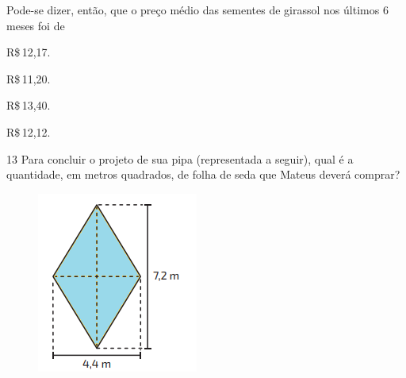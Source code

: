 Pode-se dizer, então, que o preço médio das sementes de girassol nos
últimos 6 meses foi de

\begin{escolha}
\item R\$\,12,17.
\item R\$\,11,20.
\item R\$\,13,40.
\item R\$\,12,12.
\end{escolha}









\num{13} Para concluir o projeto de sua pipa (representada a seguir),
qual é a quantidade, em metros quadrados, de
folha de seda que Mateus deverá comprar?

\begin{figure}[H]
\centering\includegraphics[width=.5\textwidth]{./imgSAEB_8_MAT/media/image59.png}
\end{figure}

